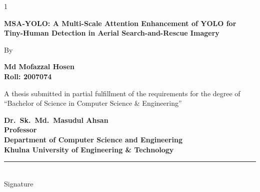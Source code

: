 \documentclass[12pt,a4paper,oneside]{report}
\begin{document}
\begin{spacing}{1}
\setlength{\parskip}{0pt}%
\begin{center}
{\tsizeEighteen\bfseries
MSA-YOLO: A Multi-Scale Attention Enhancement of YOLO for Tiny-Human Detection in Aerial Search-and-Rescue Imagery\par}

\vspace{3\tblanktitle}%

{\tsizeTwelveHalf By\par}

\vspace{2\tblanktitle}%

{\tsizeTwelveHalf\bfseries Md Mofazzal Hosen\\
\normalfont Roll: 2007074\par}

\vspace{\tblanktitle}%

{\tsizeTwelveHalf A thesis submitted in partial fulfillment of the requirements for the degree of\\
``Bachelor of Science in Computer Science \& Engineering''\par}
\end{center}

\vspace{2\tblanktitle}%


\vspace{\tblanktitle}
\noindent\hspace*{0.8in}\begin{minipage}[t]{0.60\textwidth}
{\tsizeTwelveHalf\bfseries Dr.\ Sk.\ Md.\ Masudul Ahsan\\
\normalfont Professor\\
Department of Computer Science and Engineering\\
Khulna University of Engineering \& Technology\par}
\end{minipage}%
\hfill
\begin{minipage}[t]{0.24\textwidth}\centering
  \vspace*{2.4\baselineskip}
  \rule{3.4cm}{0.4pt}\\ {\tsizeTwelveHalf Signature}
\end{minipage}


\end{spacing}
\end{document}
